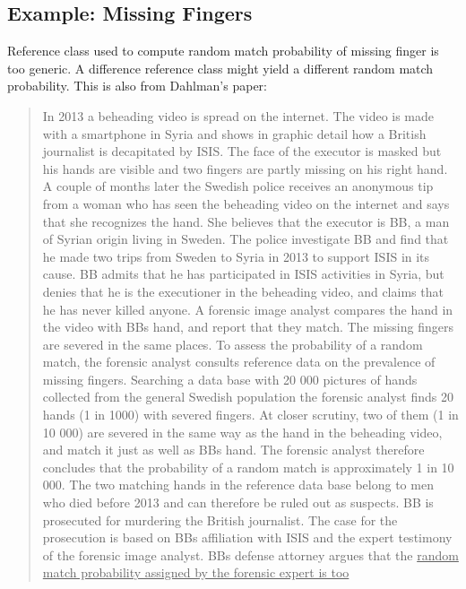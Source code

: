 \documentclass[
  10pt,
  dvipsnames,enabledeprecatedfontcommands]{scrartcl}
\begin{document}
\hypertarget{example-missing-fingers}{%
\subsection{Example: Missing Fingers}\label{example-missing-fingers}}

Reference class used to compute random match probability of missing
finger is too generic. A difference reference class might yield a
different random match probability. This is also from Dahlman's paper:

\begin{quote}
In 2013 a beheading video is spread on the internet. The video is made with a smartphone in
Syria and shows in graphic detail how a British journalist is decapitated by ISIS. The face of the
executor is masked but his hands are visible and two fingers are partly missing on his right
hand. A couple of months later the Swedish police receives an anonymous tip from a woman
who has seen the beheading video on the internet and says that she recognizes the hand. She
believes that the executor is BB, a man of Syrian origin living in Sweden. The police investigate
BB and find that he made two trips from Sweden to Syria in 2013 to support ISIS in its cause.
BB admits that he has participated in ISIS activities in Syria, but denies that he is the
executioner in the beheading video, and claims that he has never killed anyone. A forensic
image analyst compares the hand in the video with BBs hand, and report that they match. The
missing fingers are severed in the same places. To assess the probability of a random match,
the forensic analyst consults reference data on the prevalence of missing fingers. Searching a
data base with 20 000 pictures of hands collected from the general Swedish population the
forensic analyst finds 20 hands (1 in 1000) with severed fingers. At closer scrutiny, two of them
(1 in 10 000) are severed in the same way as the hand in the beheading video, and match it
just as well as BBs hand. The forensic analyst therefore concludes that the probability of a
random match is approximately 1 in 10 000.  The two matching hands in the reference data
base belong to men who died before 2013 and can therefore be ruled out as suspects. BB is
prosecuted for murdering the British journalist. The case for the prosecution is based on BBs
affiliation with ISIS and the expert testimony of the forensic image analyst. BBs defense
attorney argues that the \underline{random match probability assigned by the forensic expert is too
}
\end{quote}
\end{document}
